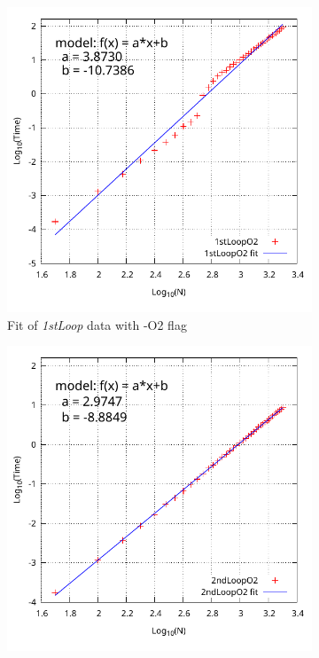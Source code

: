 \documentclass[11pt,a4paper]{article}
\begin{document}
\begin{figure}[t]
	\centering
	\begin{subfigure}{0.47\textwidth}
		\includegraphics[width=1\linewidth]{Data/Fit_1stLoopO2}
		\caption{Fit of \textit{1stLoop} data with -O2 flag}
		\label{fig:fit1stloopo2}
	\end{subfigure}%
	\hfill
	\begin{subfigure}{0.47\textwidth}
		\includegraphics[width=1\linewidth]{Data/Fit_2ndLoopO2}

\end{subfigure}
\end{figure}
\end{document}
